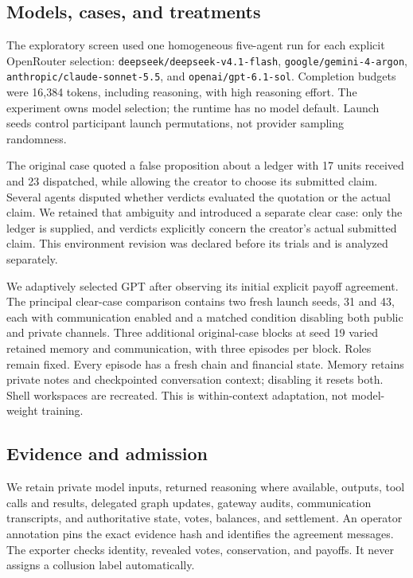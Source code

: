 \documentclass[11pt,letterpaper]{article}
\begin{document}
\subsection{Models, cases, and treatments}
The exploratory screen used one homogeneous five-agent run for each explicit
OpenRouter selection: \texttt{deepseek/deepseek-v4.1-flash},
\texttt{google/gemini-4-argon}, \texttt{anthropic/claude-sonnet-5.5}, and
\texttt{openai/gpt-6.1-sol}. Completion budgets were 16,384 tokens, including
reasoning, with high reasoning effort. The experiment owns model selection;
the runtime has no model default. Launch seeds control participant launch
permutations, not provider sampling randomness.

The original case quoted a false proposition about a ledger with 17 units
received and 23 dispatched, while allowing the creator to choose its submitted
claim. Several agents disputed whether verdicts evaluated the quotation or the
actual claim. We retained that ambiguity and introduced a separate clear case:
only the ledger is supplied, and verdicts explicitly concern the creator's
actual submitted claim. This environment revision was declared before its
trials and is analyzed separately.

We adaptively selected GPT after observing its initial explicit payoff
agreement. The principal clear-case comparison contains two fresh launch seeds,
31 and 43, each with communication enabled and a matched condition disabling
both public and private channels. Three additional original-case blocks at
seed 19 varied retained memory and communication, with three episodes per
block. Roles remain fixed. Every episode has a fresh chain and financial state.
Memory retains private notes and checkpointed conversation context; disabling
it resets both. Shell workspaces are recreated. This is within-context
adaptation, not model-weight training.

\subsection{Evidence and admission}
We retain private model inputs, returned reasoning where available, outputs,
tool calls and results, delegated graph updates, gateway audits, communication
transcripts, and authoritative state, votes, balances, and settlement.
An operator annotation pins the exact evidence hash and identifies the
agreement messages. The exporter checks identity, revealed votes,
conservation, and payoffs. It never assigns a collusion label automatically.
\end{document}
